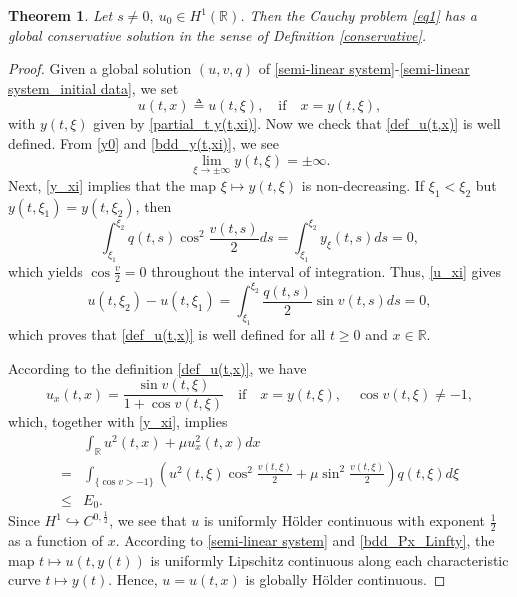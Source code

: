 \documentclass[10pt]{article}
\newtheorem{theo}{Theorem}[section]
\numberwithin{equation}{section}
\begin{document}
	\begin{theo}
		Let $s\neq0,\ u_0\in H^1(\mathbb{R})$. Then the Cauchy problem \eqref{eq1} has a global conservative solution in the sense of Definition \ref{conservative}.
	\end{theo}
	\begin{proof}
		Given a global solution $(u,v,q)$ of \eqref{semi-linear system}-\eqref{semi-linear system_initial data}, we set
		\begin{equation}\label{def_u(t,x)}
			u(t,x)\triangleq u(t,\xi),\quad\mathrm{if}\quad x=y(t,\xi),
		\end{equation}
		with $y(t,\xi)$ given by \eqref{partial_t y(t,xi)}. Now we check that \eqref{def_u(t,x)} is well defined. From \eqref{y0} and \eqref{bdd_y(t,xi)}, we see
		$$\lim_{\xi\to\pm\infty}y(t,\xi)=\pm\infty.$$
		Next, \eqref{y_xi} implies that the map $\xi\mapsto y(t,\xi)$ is non-decreasing. If $\xi_1<\xi_2$ but $y(t,\xi_1)=y(t,\xi_2)$, then
		$$\int_{\xi_1}^{\xi_2}q(t,s)\cos^2\frac{v(t,s)}{2}ds=\int_{\xi_1}^{\xi_2}y_\xi(t,s)ds=0,$$
		which yields $\cos\frac{v}{2}=0$ throughout the interval of integration. Thus, \eqref{u_xi} gives
		$$u(t,\xi_2)-u(t,\xi_1)=\int_{\xi_1}^{\xi_2}\frac{q(t,s)}{2}\sin v(t,s)ds=0,$$
		which proves that \eqref{def_u(t,x)} is well defined for all $t\geq0$ and $x\in\mathbb{R}$.
		
		According to the definition \eqref{def_u(t,x)}, we have
		\begin{equation*}
			u_x(t,x)=\frac{\sin v(t,\xi)}{1+\cos v(t,\xi)}\quad\mathrm{if}\quad x=y(t,\xi),\quad\cos v(t,\xi)\neq-1,
		\end{equation*}
		which, together with \eqref{y_xi}, implies
		\begin{align*}
			&\int_{\mathbb{R}}u^{2}(t,x)+\mu u_{x}^{2}(t,x)dx \\
			=&\int_{\{\cos v>-1\}}\left(u^2(t,\xi)\cos^2\frac{v(t,\xi)}{2}+\mu\sin^2\frac{v(t,\xi)}{2}\right)q(t,\xi)d\xi \\
			\leq& E_{0}.
		\end{align*}
		Since $H^1\hookrightarrow C^{0,\frac{1}{2}}$, we see that $u$ is uniformly H\"{o}lder continuous with exponent $\frac{1}{2}$ as a function of $x$. According to \eqref{semi-linear system} and \eqref{bdd_Px_Linfty}, the map $t\mapsto u(t,y(t))$ is uniformly Lipschitz continuous along each characteristic curve $t\mapsto y(t)$. Hence, $u=u(t,x)$ is globally H\"{o}lder continuous.
		

\end{proof}
\end{document}
